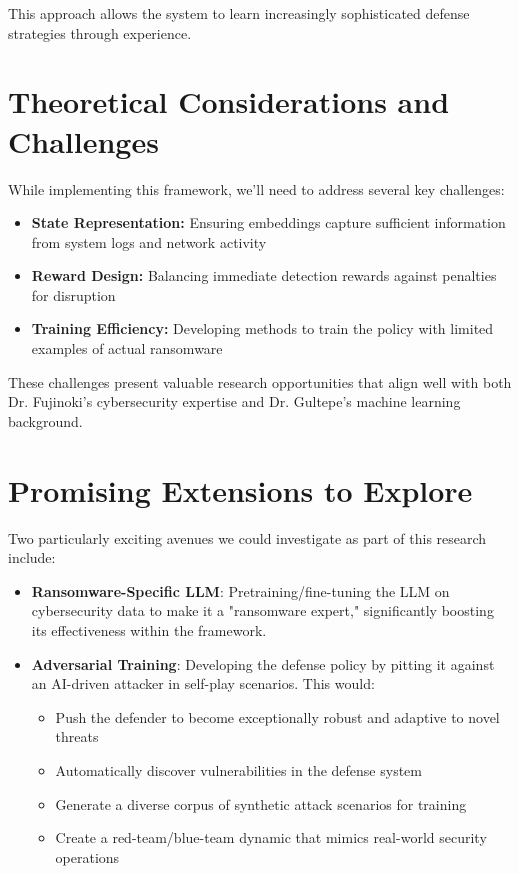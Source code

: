 \documentclass[11pt]{article}
\begin{document}
This approach allows the system to learn increasingly sophisticated defense strategies through experience.

\section*{Theoretical Considerations and Challenges}

While implementing this framework, we'll need to address several key challenges:

\begin{itemize}
    \item \textbf{State Representation:} Ensuring embeddings capture sufficient information from system logs and network activity
    \item \textbf{Reward Design:} Balancing immediate detection rewards against penalties for disruption
    \item \textbf{Training Efficiency:} Developing methods to train the policy with limited examples of actual ransomware
\end{itemize}

These challenges present valuable research opportunities that align well with both Dr. Fujinoki's cybersecurity expertise and Dr. Gultepe's machine learning background.

\section*{Promising Extensions to Explore}

Two particularly exciting avenues we could investigate as part of this research include:

\begin{itemize}
    \item \textbf{Ransomware-Specific LLM}: Pretraining/fine-tuning the LLM on cybersecurity data to make it a "ransomware expert," significantly boosting its effectiveness within the framework.
    
    \item \textbf{Adversarial Training}: Developing the defense policy by pitting it against an AI-driven attacker in self-play scenarios. This would:
    \begin{itemize}
        \item Push the defender to become exceptionally robust and adaptive to novel threats
        \item Automatically discover vulnerabilities in the defense system
        \item Generate a diverse corpus of synthetic attack scenarios for training
        \item Create a red-team/blue-team dynamic that mimics real-world security operations
    \end{itemize}
\end{itemize}
\end{document}
